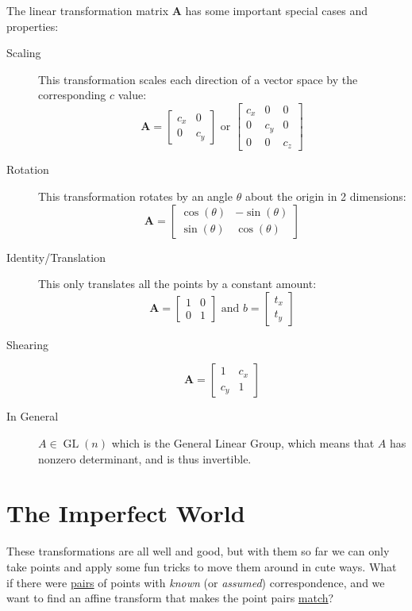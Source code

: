 The linear transformation matrix $\mathbf{A}$ has some important special cases and properties:
\begin{description}
	\item[Scaling] This transformation scales each direction of a vector space by the corresponding $c$ value: $$\mathbf{A}=\left[\begin{matrix}
	c_x & 0 \\ 0 & c_y
	\end{matrix}\right] \text{ or } \left[\begin{matrix}
	c_x & 0 &0\\ 0 & c_y &0\\ 0&0&c_z
	\end{matrix}\right]$$
	
	\item[Rotation] This transformation rotates by an angle $\theta$ about the origin in 2 dimensions:$$\mathbf{A}=\left[\begin{matrix}
	\cos(\theta) & -\sin(\theta) \\\sin(\theta) & \cos(\theta)
	\end{matrix}\right]$$ 

	\item[Identity/Translation] This only translates all the points by a constant amount:$$\mathbf{A}=\left[\begin{matrix}
	1 & 0 \\0 &1
	\end{matrix}\right] \text{ and } b=\left[\begin{matrix}t_x\\t_y\end{matrix}\right]$$
	
	\item[Shearing]
	$$\mathbf{A}=\left[\begin{matrix}
	1 & c_x \\c_y &1
	\end{matrix}\right]$$
	\item[In General] $A\in \operatorname{GL}\left(n\right)$ which is the General Linear Group, which means that $A$ has nonzero determinant, and is thus invertible.
	
\end{description}

\section{The Imperfect World}

These transformations are all well and good, but with them so far we can only take points and apply some fun tricks to move them around in cute ways. What if there were \underline{pairs} of points with \emph{known} (or \emph{assumed}) correspondence, and we want to find an affine transform that makes the point pairs \underline{match}?

